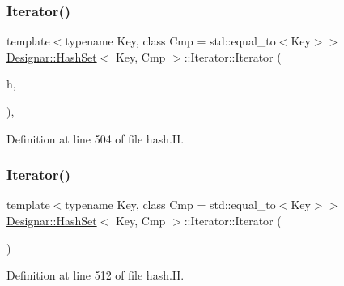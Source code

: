 \subsubsection{\texorpdfstring{Iterator()}{Iterator()}\hspace{0.1cm}{\footnotesize\ttfamily [1/5]}}
{\footnotesize\ttfamily template$<$typename Key, class Cmp = std\+::equal\+\_\+to$<$\+Key$>$$>$ \\
\hyperlink{class_designar_1_1_hash_set}{Designar\+::\+Hash\+Set}$<$ Key, Cmp $>$\+::Iterator\+::\+Iterator (\begin{DoxyParamCaption}\item[{const \hyperlink{class_designar_1_1_hash_set}{Hash\+Set} \&}]{h,  }\item[{int}]{ }\end{DoxyParamCaption})\hspace{0.3cm}{\ttfamily [inline]}, {\ttfamily [protected]}}



Definition at line 504 of file hash.\+H.

\mbox{\label{class_designar_1_1_hash_set_1_1_iterator_a35f9b2ac54be788fa6c2b8a274c7e308}} 
\subsubsection{\texorpdfstring{Iterator()}{Iterator()}\hspace{0.1cm}{\footnotesize\ttfamily [2/5]}}
{\footnotesize\ttfamily template$<$typename Key, class Cmp = std\+::equal\+\_\+to$<$\+Key$>$$>$ \\
\hyperlink{class_designar_1_1_hash_set}{Designar\+::\+Hash\+Set}$<$ Key, Cmp $>$\+::Iterator\+::\+Iterator (\begin{DoxyParamCaption}{ }\end{DoxyParamCaption})\hspace{0.3cm}{\ttfamily [inline]}}



Definition at line 512 of file hash.\+H.

\mbox{\label{class_designar_1_1_hash_set_1_1_iterator_a1047f02ec4c3bfd5919ef66b28ca537c}} 
